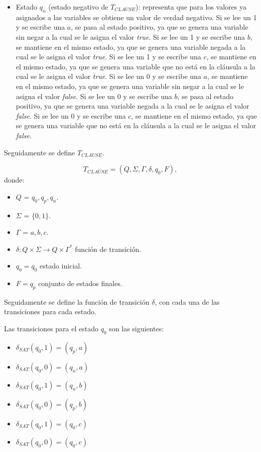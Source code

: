 \documentclass[12pt]{article}
\newcommand{\true}{\textit{true}}
\newcommand{\false}{\textit{false}}
\begin{document}
\begin{itemize}
    \item Estado $q_n$ (estado negativo de $T_{CLAUSE}$): representa que para los valores ya asignados a las
          variables se obtiene un valor de verdad negativo.  Si se lee un 1 y se escribe una $a$, se pasa al estado positivo, ya que se genera una variable sin negar a la cual se le asigna el valor \true{}.  Si se lee un 1 y se escribe una $b$, se mantiene en el mismo estado, ya que se genera una variable negada a la cual se le asigna el valor \true{}.  Si se lee un 1 y se escribe una $c$, se mantiene en el mismo estado, ya que se genera una variable que no está en la cláusula a la cual se le asigna el valor \true{}.  Si se lee un 0 y se escribe una $a$, se mantiene en el mismo estado, ya que se genera una variable sin negar a la cual se le asigna el valor \false{}.  Si se lee un 0 y se escribe una $b$, se pasa al estado positivo, ya que se genera una variable negada a la cual se le asigna el valor \false{}.  Si se lee un 0 y se escribe una $c$, se mantiene en el mismo estado, ya que se genera una variable que no está en la cláusula a la cual se le asigna el valor \false{}.
\end{itemize}

Seguidamente se define $T_{CLAUSE}$.

\[
    T_{CLAUSE} = (Q, {\Sigma}, \Gamma, \delta, q_{0}, F),
\]
donde:
\begin{itemize}
    \item \(Q\) = ${q_0,q_p,q_n}$.
    \item \(\Sigma\) = $\{0,1\}$.
    \item \(\Gamma\) = ${a,b,c}$.
    \item \(\delta: Q \times \Sigma \to Q \times \Gamma^*\) función de transición.
    \item \(q_{0} = q_0\) estado inicial.
    \item \(F={q_p}\) conjunto de estados finales.
\end{itemize}

Seguidamente  se define la función de transición $\delta$, con cada una de las transiciones para cada estado.

Las transiciones para el estado $q_0$ son las siguientes:
\begin{multicols}{2}
    \begin{itemize}
        \item $\delta_{SAT}(q_0,1)=(q_p,a)$
        \item $\delta_{SAT}(q_0,0)=(q_n,a)$
        \item $\delta_{SAT}(q_0,1)=(q_n,b)$
        \item $\delta_{SAT}(q_0,0)=(q_p,b)$
        \item $\delta_{SAT}(q_0,1)=(q_0,c)$
        \item $\delta_{SAT}(q_0,0)=(q_0,c)$
    \end{itemize}
\end{multicols}
\end{document}
